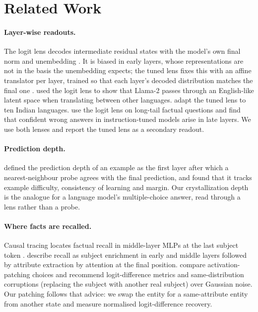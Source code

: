 \section{Related Work}

\paragraph{Layer-wise readouts.}
The logit lens decodes intermediate residual states with the model's own final norm and unembedding \citep{nostalgebraist2020logitlens}.
It is biased in early layers, whose representations are not in the basis the unembedding expects; the tuned lens fixes this with an affine translator per layer, trained so that each layer's decoded distribution matches the final one \citep{belrose2023tuned}.
\citet{wendler-etal-2024-llamas} used the logit lens to show that Llama-2 passes through an English-like latent space when translating between other languages.
\citet{panchal-etal-2026-indic} adapt the tuned lens to ten Indian languages.
\citet{huang2026alignment} use the logit lens on long-tail factual questions and find that confident wrong answers in instruction-tuned models arise in late layers.
We use both lenses and report the tuned lens as a secondary readout.

\paragraph{Prediction depth.}
\citet{baldock2021difficulty} defined the prediction depth of an example as the first layer after which a nearest-neighbour probe agrees with the final prediction, and found that it tracks example difficulty, consistency of learning and margin.
Our crystallization depth is the analogue for a language model's multiple-choice answer, read through a lens rather than a probe.

\paragraph{Where facts are recalled.}
Causal tracing locates factual recall in middle-layer MLPs at the last subject token \citep{meng2022locating}.
\citet{geva-etal-2023-dissecting} describe recall as subject enrichment in early and middle layers followed by attribute extraction by attention at the final position.
\citet{zhang2024patching} compare activation-patching choices and recommend logit-difference metrics and same-distribution corruptions (replacing the subject with another real subject) over Gaussian noise.
Our patching follows that advice: we swap the entity for a same-attribute entity from another state and measure normalised logit-difference recovery.

